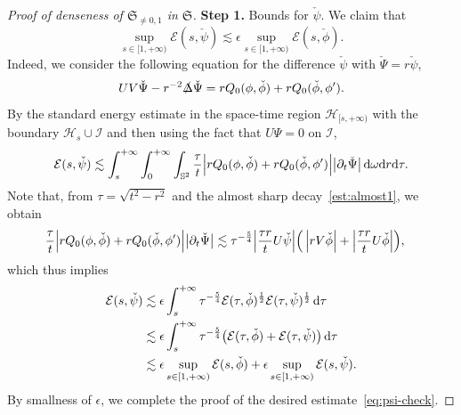 \documentclass[a4paper,reqno]{amsart}
\theoremstyle{definition}
\numberwithin{equation}{section}
\def \d {{\rm{d}}}
\def\Sfrak{\mathfrak{S}}
\begin{document}
\begin{proof}[Proof of denseness of $\Sfrak_{\neq 0, 1}$ in $\Sfrak$]
\smallskip
\textbf{Step 1.} Bounds for $\check{\psi}$.
We claim that 
\begin{equation}\label{eq:psi-check}
    \sup_{s\in [1, +\infty)} \mathcal{E}(s, \check{\psi})
    \lesssim
    \epsilon \sup_{s\in [1, +\infty)} \mathcal{E}(s, \check{\phi}).
\end{equation}
Indeed, we consider the following equation for the difference $\check{\psi}$ with $\check{\Psi}=r\check{\psi}$,
\begin{align*}
    UV \check{\Psi} - r^{-2} \slashed{\Delta} \check{\Psi}
    =
    rQ_0(\phi, \check{\phi}) + rQ_0(\check{\phi}, \phi').
\end{align*}
By the standard energy estimate in the space-time region $\mathcal{H}_{[s,+\infty)}$ with the boundary $\mathcal{H}_{s}\cup \mathcal{I}$ and then using the fact that $U\Psi=0$ on $\mathcal{I}$,
\begin{equation*}
    \mathcal{E}(s, \check{\psi}) 
    \lesssim
    \int_{s}^{+\infty} \int_{0}^{+\infty}\int_{\mathbb{S}^2} {\tau\over t}\Big| rQ_0(\phi, \check{\phi}) + rQ_0(\check{\phi}, \phi') \Big| \big|\partial_t \check{\Psi}\big| \, \d \omega \d r \d\tau.
\end{equation*}
Note that, from $\tau=\sqrt{t^{2}-r^{2}}$ and the almost sharp decay~\eqref{est:almost1}, we obtain
\begin{equation*}
\begin{aligned}
    &{\tau\over t}\Big| rQ_0(\phi, \check{\phi}) + rQ_0(\check{\phi}, \phi') \Big| \big|\partial_t \check{\Psi}\big|
    \lesssim \tau^{-\frac{5}{4}} \Big|\frac{\tau r}{t} U\check{\psi}\Big|
    \Big(\left|rV\check{\phi}\right|+\Big|\frac{\tau r}{t} U\check{\phi}\Big|\Big),
    \end{aligned}
\end{equation*}
which thus implies 
\begin{align*}
    \mathcal{E}(s, \check{\psi}) 
    &\lesssim
    \epsilon \int_s^{+\infty} \tau^{-{5\over 4}} \mathcal{E}(\tau, \check{\phi})^{1\over 2} \mathcal{E}(\tau, \check{\psi})^{1\over 2} \, \d\tau
    \\
    &\lesssim
    \epsilon \int_s^{+\infty} \tau^{-{5\over 4}} \big(\mathcal{E}(\tau, \check{\phi}) + \mathcal{E}(\tau, \check{\psi}) \big) \, \d\tau\\
    &\lesssim
    \epsilon \sup_{s\in [1, +\infty)}\mathcal{E}(s,\check{\phi}) + \epsilon\sup_{s\in [1, +\infty)}\mathcal{E}(s, \check{\psi}).
\end{align*}
By smallness of $\epsilon$, we complete the proof of the desired estimate~\eqref{eq:psi-check}.


\end{proof}
\end{document}
